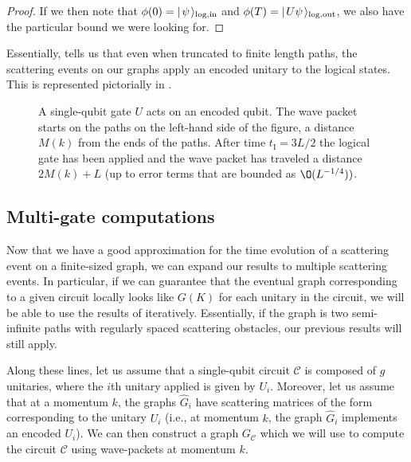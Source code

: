 \documentclass[../thesis-main/thesis-main]{subfiles}
\begin{document}
\begin{proof}
If we then note that $\phi(0) = |\mspace{2mu} \psi \mspace{2mu} \rangle_{\text{log},\text{in}}$ and $\phi(T) = |\mspace{2mu} U \psi \mspace{2mu} \rangle_{\text{log},\text{out}}$, we also have the particular bound we were looking for.
\end{proof}

Essentially,  tells us that even when truncated to finite length paths, the scattering events on our graphs apply an encoded unitary to the logical states.  This is represented pictorially in .
 


\begin{figure}
  \centering
  
  \caption{A single-qubit gate $U$ acts on an encoded qubit. The wave packet starts on the paths on the left-hand side of the figure, a distance $M(k)$ from the ends of the paths. After time $t_{\mathrm{I}}={3L}/{2}$ the logical gate has been applied and the wave packet has traveled a distance $2M(k)+L$ (up to error terms that are bounded as $\O(L^{-{1}/{4}}))$.}
  \label{fig:single_particle_cartoon}
\end{figure}


\subsection{Multi-gate computations}\label{sec:single_qubit_multi_gate_computation}

Now that we have a good approximation for the time evolution of a scattering event on a finite-sized graph, we can expand our results to multiple scattering events.  In particular, if we can guarantee that the eventual graph corresponding to a given circuit locally looks like $G(K)$ for each unitary in the circuit, we will be able to use the results of  iteratively.  Essentially, if the graph is two semi-infinite paths with regularly spaced scattering obstacles, our previous results will still apply.


Along these lines, let us assume that a single-qubit circuit $\mathcal{C}$ is composed of $g$ unitaries, where the $i$th unitary applied is given by $U_i$.  Moreover, let us assume that at a momentum $k$, the graphs $\widehat{G}_i$ have scattering matrices of the form  corresponding to the unitary $U_i$ (i.e., at momentum $k$, the graph $\widehat{G}_i$ implements an encoded $U_i$).  We can then construct a graph $G_{\mathcal{C}}$ which we will use to compute the circuit $\mathcal{C}$ using wave-packets at momentum $k$. 
\end{document}

